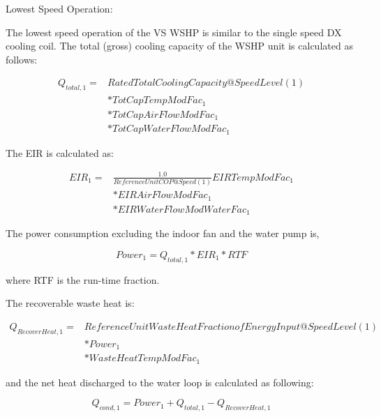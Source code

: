 Lowest Speed Operation:

The lowest speed operation of the VS WSHP is similar to the single speed DX cooling coil. The total (gross) cooling capacity of the WSHP unit is calculated as follows:

\begin{equation}
 \begin{array}{rl}
  Q_{total,1} =& RatedTotalCoolingCapacity@SpeedLevel\left( 1 \right) \\
              &* TotCapTempModFac_1 \\
              &* TotCapAirFlowModFac_1 \\
              &* TotCapWaterFlowModFac_1
 \end{array}
\end{equation}

The EIR is calculated as:

\begin{equation}
  \begin{array}{rl}
    EIR_1 =& \frac{1.0}{ReferenceUnitCOP@Speed(1)} EIRTempModFac_1 \\
          &* EIRAirFlowModFac_1 \\
          &* EIRWaterFlowModWaterFac_1
  \end{array}
\end{equation}

The power consumption excluding the indoor fan and the water pump is,

\begin{equation}
Powe{r_1} = {Q_{total,1}}*EI{R_1}*RTF
\end{equation}

where RTF is the run-time fraction.

The recoverable waste heat is:

\begin{equation}
  \begin{array}{rl}
    Q_{RecoverHeat,1} =& ReferenceUnitWasteHeatFractionofEnergyInput@SpeedLevel\left( 1 \right) \\
                      &* Power_1 \\
                      &* WasteHeatTempModFac_1
  \end{array}
\end{equation}

and the net heat discharged to the water loop is calculated as following:

\begin{equation}
{Q_{cond,1}} = Powe{r_1} + {Q_{total,1}} - {Q_{RecoverHeat,1}}
\end{equation}

